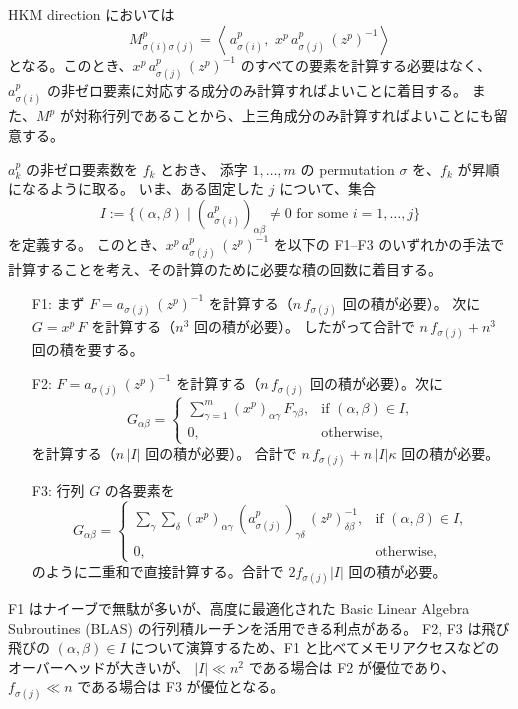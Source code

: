 \documentclass{jsarticle}
\newcommand{\inprod}[2]{\left\langle #1, \, #2 \right\rangle}
\begin{document}
\medskip

HKM direction においては
\[
  M^p_{\sigma(i)\sigma(j)}
  = \inprod{\,a^p_{\sigma(i)}}{\,x^p\,a^p_{\sigma(j)}\,(z^p)^{-1}}
\]
となる。このとき、$x^p\,a^p_{\sigma(j)}\,(z^p)^{-1}$ のすべての要素を計算する必要はなく、
$a^p_{\sigma(i)}$ の非ゼロ要素に対応する成分のみ計算すればよいことに着目する。
また、$M^p$ が対称行列であることから、上三角成分のみ計算すればよいことにも留意する。

\medskip

$a^p_k$ の非ゼロ要素数を $f_k$ とおき、
添字 $1,\ldots,m$ の permutation $\sigma$ を、$f_k$ が昇順になるように取る。
いま、ある固定した $j$ について、集合
\[
  I
  := \bigl\{(\alpha,\beta)\mid (a^p_{\sigma(i)})_{\alpha\beta}\neq 0
         \text{ for some } i=1,\ldots,j \bigr\}
\]
を定義する。
このとき、$x^p\,a^p_{\sigma(j)}\,(z^p)^{-1}$ を以下の F1--F3 のいずれかの手法で計算することを考え、その計算のために必要な積の回数に着目する。

\begin{enumerate}
\item[F1:] まず $F=a_{\sigma(j)}\,(z^p)^{-1}$ を計算する（$n\,f_{\sigma(j)}$ 回の積が必要）。
           次に $G=x^p\,F$ を計算する（$n^3$ 回の積が必要）。
           したがって合計で $n\,f_{\sigma(j)} + n^3$ 回の積を要する。
\item[F2:] $F=a_{\sigma(j)}\,(z^p)^{-1}$ を計算する（$n\,f_{\sigma(j)}$ 回の積が必要）。次に
  \[
    G_{\alpha\beta}=
    \begin{cases}
     \sum_{\gamma=1}^m (x^p)_{\alpha\gamma}\,F_{\gamma\beta}, & \text{if } (\alpha,\beta)\in I,\\
     0, & \text{otherwise},
    \end{cases}
  \]
  を計算する（$n\,|I|$ 回の積が必要）。  
  合計で $n\,f_{\sigma(j)} + n\,|I|\kappa$ 回の積が必要。
\item[F3:] 行列 $G$ の各要素を
  \[
    G_{\alpha\beta}=
    \begin{cases}
      \sum_{\gamma}\sum_{\delta}
        (x^p)_{\alpha\gamma}\,(a^p_{\sigma(j)})_{\gamma\delta}\,(z^p)^{-1}_{\delta\beta},
       & \text{if } (\alpha,\beta) \in I,\\
      0, & \text{otherwise},
    \end{cases}
  \]
  のように二重和で直接計算する。合計で $2f_{\sigma(j)}|I|$ 回の積が必要。
\end{enumerate}

\noindent
F1 はナイーブで無駄が多いが、高度に最適化された Basic Linear Algebra Subroutines (BLAS) の行列積ルーチンを活用できる利点がある。
F2, F3 は飛び飛びの $(\alpha,\beta) \in I$ について演算するため、F1 と比べてメモリアクセスなどのオーバーヘッドが大きいが、
$|I| \ll n^2$ である場合は F2 が優位であり、$f_{\sigma(j)} \ll n$ である場合は F3 が優位となる。
\end{document}
